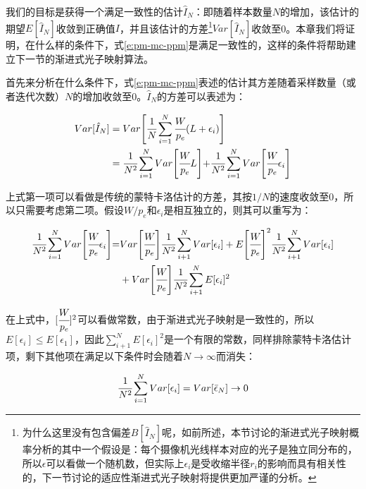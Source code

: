 我们的目标是获得一个满足一致性的估计$\hat{I}_N$：即随着样本数量$N$的增加，该估计的期望$E[\hat{I}_N]$收敛到正确值$I$，并且该估计的方差\footnote{为什么这里没有包含偏差$B[\hat{I}_N]$呢，如前所述，本节讨论的渐进式光子映射概率分析的其中一个假设是：每个摄像机光线样本对应的光子是独立同分布的，所以$\epsilon$可以看做一个随机数，但实际上$\epsilon_i$是受收缩半径$r_i$的影响而具有相关性的，下一节讨论的适应性渐进式光子映射将提供更加严谨的分析。}$Var[\hat{I}_N]$收敛至0。本章我们将证明，在什么样的条件下，式\ref{e:pm-mc-ppm}是满足一致性的，这样的条件将帮助建立下一节的渐进式光子映射算法。

首先来分析在什么条件下，式\ref{e:pm-mc-ppm}表述的估计其方差随着采样数量（或者迭代次数）$N$的增加收敛至0。$\hat{I}_N$的方差可以表述为：

\begin{equation}
\begin{aligned}
	Var[\hat{I}_N]&=Var\Biggl[ \cfrac{1}{N}\sum^{N}_{i=1} \cfrac{W}{p_e}(L+\epsilon_i) \Biggl]\\
	&= \cfrac{1}{N^{2}}\sum^{N}_{i=1}Var\Biggl[ \cfrac{W}{p_e}L \Biggl]+ \cfrac{1}{N^{2}}\sum^{N}_{i=1}Var\Biggl[ \cfrac{W}{p_e}\epsilon_i \Biggl]
\end{aligned}
\end{equation}

\noindent 上式第一项可以看做是传统的蒙特卡洛估计的方差，其按$1/N$的速度收敛至0，所以只需要考虑第二项。假设$W/p_e$和$\epsilon_i$是相互独立的，则其可以重写为：

\begin{equation}
\begin{aligned}
	 \cfrac{1}{N^{2}}\sum^{N}_{i=1}Var\Biggl[ \cfrac{W}{p_e}\epsilon_i \Biggl]=&Var\Biggl[ \cfrac{W}{p_e}\Biggl] \cfrac{1}{N^{2}}\sum^{N}_{i+1}Var[\epsilon_i]+E\Biggl[ \cfrac{W}{p_e}\Biggl]^{2} \cfrac{1}{N^{2}}\sum^{N}_{i+1}Var[\epsilon_i]\\
	&+Var\Biggl[ \cfrac{W}{p_e}\Biggl] \cfrac{1}{N^{2}}\sum^{N}_{i+1}E[\epsilon_i]^{2}
\end{aligned}
\end{equation}

\noindent 在上式中，$[ \cfrac{W}{p_e}]^{2}$可以看做常数，由于渐进式光子映射是一致性的，所以$E[\epsilon_i]\leq E[\epsilon_1]$，因此$\sum^{N}_{i+1}E[\epsilon_i]^{2}$是一个有限的常数，同样排除蒙特卡洛估计项，剩下其他项在满足以下条件时会随着$N\to\infty$而消失：

\begin{equation}
	 \cfrac{1}{N^{2}}\sum^{N}_{i=1}Var[\epsilon_i]=Var[\bar{\epsilon}_N]\to 0
\end{equation}

